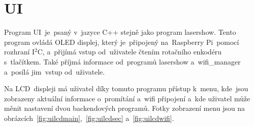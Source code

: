 \section{UI}
Program UI~je~psaný v~jazyce C++ stejně jako program lasershow. Tento program ovládá OLED displej, který je~připojený na~Raspberry Pi~pomocí rozhraní I$^{2}$C, a~přijímá vstup od~uživatele čtením rotačního enkodéru s~tlačítkem. Také příjmá informace od~programů lasershow a~wifi\_manager a~posílá jim~vstup od~uživatele.

Na LCD~displeji má uživatel díky tomuto programu přístup k~menu, kde~jsou zobrazeny aktuální informace o~promítání a~wifi připojení a~kde uživatel může měnit nastavení dvou backendových programů. Fotky zobrazení menu jsou na obrázcích~\ref{fig:uilcdmain},~\ref{fig:uilcdsec} a~\ref{fig:uilcdwifi}.

